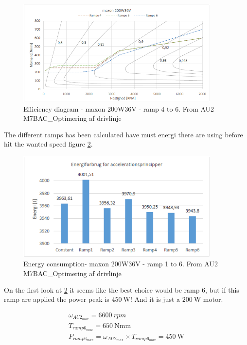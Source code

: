 \begin{figure}[H]
	\centering
	\includegraphics [width=4in]{Software/Pictures/Momentramper-4-6.PNG}
	\caption{Efficiency diagram - maxon 200W36V - ramp 4 to 6. From AU2 M7BAC\_Optimering af drivlinje}
	\label{fig:eff_maxon_36V_ramp4-6}
\end{figure}

The different ramps has been calculated have must energi there are using before hit the wanted speed figure \ref{fig:eff_maxon_36V_ramp_energy-consumption}.

\begin{figure}[H]
	\centering
	\includegraphics [width=4in]{Software/Pictures/energy-consumption.PNG}
	\caption{Energy consumption- maxon 200W36V - ramp 1 to 6. From AU2 M7BAC\_Optimering af drivlinje}
	\label{fig:eff_maxon_36V_ramp_energy-consumption}
\end{figure}

On the first look at \ref{fig:eff_maxon_36V_ramp_energy-consumption} it seems like the best choice would be ramp 6, but if this ramp are applied the power peak is $ \SI{450}{\watt} $! And it is just a $ \SI{200}{\watt} $ motor. 

\begin{equation}
	\begin{split}
		\omega_{AU2_{max}} = \SI{6600}{rpm}\\
		T_{ramp6_{max}} = \SI{650}{\newton \milli\metre} \\
		P_{ramp6_{max}} = \omega_{AU2_{max}} \times T_{ramp6_{max}} = \SI{450}{\watt}
	\end{split}
\end{equation}

